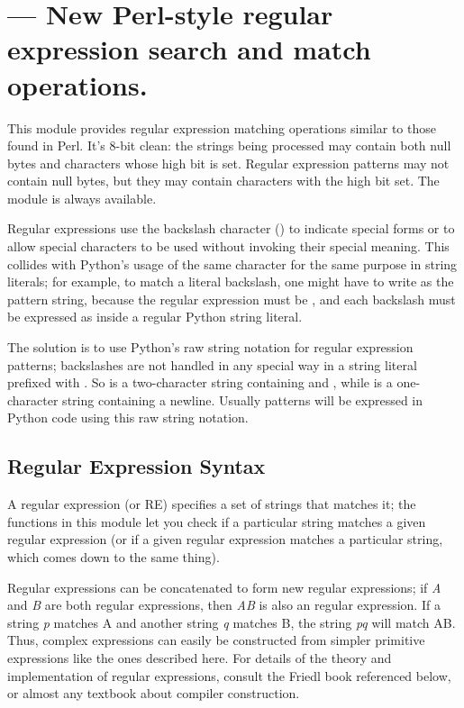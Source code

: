 \section{ ---
         New Perl-style regular expression search and match operations.}




This module provides regular expression matching operations similar to
those found in Perl.  It's 8-bit clean: the strings being processed
may contain both null bytes and characters whose high bit is set.  Regular
expression patterns may not contain null bytes, but they may contain
characters with the high bit set.  The  module is always
available.

Regular expressions use the backslash character (\character{\e}) to
indicate special forms or to allow special characters to be used
without invoking their special meaning.  This collides with Python's
usage of the same character for the same purpose in string literals;
for example, to match a literal backslash, one might have to write
 as the pattern string, because the regular expression
must be \samp{\e\e}, and each backslash must be expressed as
\samp{\e\e} inside a regular Python string literal. 

The solution is to use Python's raw string notation for regular
expression patterns; backslashes are not handled in any special way in
a string literal prefixed with .  So  is a
two-character string containing \character{\e} and ,
while  is a one-character string containing a newline.
Usually patterns will be expressed in Python code using this raw
string notation.

\subsection{Regular Expression Syntax \label{re-syntax}}

A regular expression (or RE) specifies a set of strings that matches
it; the functions in this module let you check if a particular string
matches a given regular expression (or if a given regular expression
matches a particular string, which comes down to the same thing).

Regular expressions can be concatenated to form new regular
expressions; if \emph{A} and \emph{B} are both regular expressions,
then \emph{AB} is also an regular expression.  If a string \emph{p}
matches A and another string \emph{q} matches B, the string \emph{pq}
will match AB.  Thus, complex expressions can easily be constructed
from simpler primitive expressions like the ones described here.  For
details of the theory and implementation of regular expressions,
consult the Friedl book referenced below, or almost any textbook about
compiler construction.

